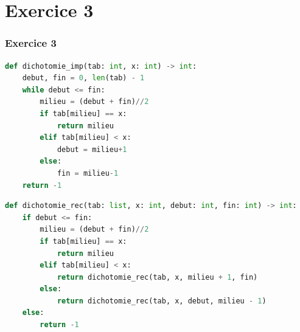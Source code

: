 \documentclass[svgnames,11pt]{beamer}
\begin{document}
\section{Exercice 3}
\begin{frame}[fragile]
    \frametitle{Exercice 3}

    \begin{center}
        \begin{lstlisting}[language=Python , basicstyle=\ttfamily\small, xleftmargin=2em, xrightmargin=2em]
def dichotomie_imp(tab: int, x: int) -> int:
    debut, fin = 0, len(tab) - 1
    while debut <= fin:
        milieu = (debut + fin)//2
        if tab[milieu] == x:
            return milieu
        elif tab[milieu] < x:
            debut = milieu+1
        else:
            fin = milieu-1
    return -1
\end{lstlisting}
        \label{CODE}
    \end{center}

\end{frame}
\begin{frame}[fragile]

    \begin{center}
        \begin{lstlisting}[language=Python , basicstyle=\ttfamily\small, xleftmargin=2em, xrightmargin=2em]
def dichotomie_rec(tab: list, x: int, debut: int, fin: int) -> int:
    if debut <= fin:
        milieu = (debut + fin)//2
        if tab[milieu] == x:
            return milieu
        elif tab[milieu] < x:
            return dichotomie_rec(tab, x, milieu + 1, fin)
        else:
            return dichotomie_rec(tab, x, debut, milieu - 1)
    else:
        return -1
\end{lstlisting}
        \label{CODE}
    \end{center}

\end{frame}
\end{document}
